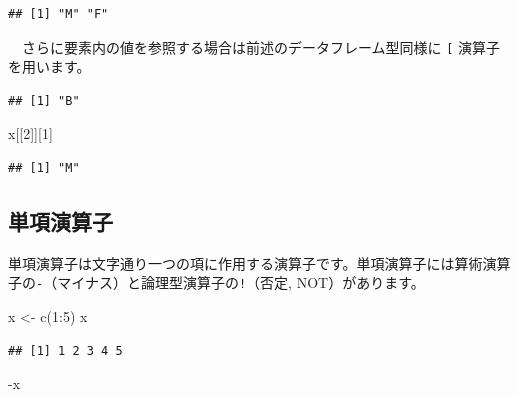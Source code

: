 \documentclass[
  12pt,
]{book}
\newenvironment{Shaded}{\begin{snugshade}}{\end{snugshade}}
\newcommand{\DecValTok}[1]{\textcolor[rgb]{0.00,0.00,0.81}{#1}}
\newcommand{\FunctionTok}[1]{\textcolor[rgb]{0.00,0.00,0.00}{#1}}
\newcommand{\NormalTok}[1]{#1}
\newcommand{\OtherTok}[1]{\textcolor[rgb]{0.56,0.35,0.01}{#1}}
\newcommand{\SpecialCharTok}[1]{\textcolor[rgb]{0.00,0.00,0.00}{#1}}
\begin{document}
\begin{verbatim}
## [1] "M" "F"
\end{verbatim}

　さらに要素内の値を参照する場合は前述のデータフレーム型同様に \texttt{{[}} 演算子を用います。

\begin{Shaded}
\end{Shaded}

\begin{verbatim}
## [1] "B"
\end{verbatim}

\begin{Shaded}
\begin{Highlighting}[numbers=left,,]
\NormalTok{x[[}\DecValTok{2}\NormalTok{]][}\DecValTok{1}\NormalTok{]}
\end{Highlighting}
\end{Shaded}

\begin{verbatim}
## [1] "M"
\end{verbatim}

\hypertarget{ux5358ux9805ux6f14ux7b97ux5b50}{%
\subsection{単項演算子}\label{ux5358ux9805ux6f14ux7b97ux5b50}}

単項演算子は文字通り一つの項に作用する演算子です。単項演算子には算術演算子の\texttt{-}（マイナス）と論理型演算子の\texttt{!}（否定, NOT）があります。

\begin{Shaded}
\begin{Highlighting}[numbers=left,,]
\NormalTok{x }\OtherTok{\textless{}{-}} \FunctionTok{c}\NormalTok{(}\DecValTok{1}\SpecialCharTok{:}\DecValTok{5}\NormalTok{)}
\NormalTok{x}
\end{Highlighting}
\end{Shaded}

\begin{verbatim}
## [1] 1 2 3 4 5
\end{verbatim}

\begin{Shaded}
\begin{Highlighting}[numbers=left,,]
\SpecialCharTok{{-}}\NormalTok{x}
\end{Highlighting}
\end{Shaded}
\end{document}

